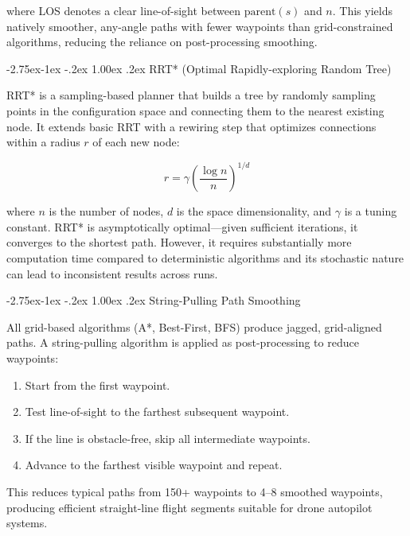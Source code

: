 \documentclass[11pt,a4paper,twocolumn]{article}
\makeatletter
\renewcommand{\subsection}{\@startsection{subsection}{2}{\z@}%
  {-2.75ex\@plus -1ex \@minus -.2ex}%
  {1.00ex \@plus .2ex}%
  {\normalfont\normalsize\bfseries\itshape}}
\makeatother
\begin{document}
\noindent where LOS denotes a clear line-of-sight between $\text{parent}(s)$ and $n$. This yields natively smoother, any-angle paths with fewer waypoints than grid-constrained algorithms, reducing the reliance on post-processing smoothing.

\subsection{RRT* (Optimal Rapidly-exploring Random Tree)}

RRT* \cite{karaman2011rrt} is a sampling-based planner that builds a tree by randomly sampling points in the configuration space and connecting them to the nearest existing node. It extends basic RRT with a rewiring step that optimizes connections within a radius $r$ of each new node:

\begin{equation}
r = \gamma \left(\frac{\log n}{n}\right)^{1/d}
\end{equation}

\noindent where $n$ is the number of nodes, $d$ is the space dimensionality, and $\gamma$ is a tuning constant. RRT* is asymptotically optimal---given sufficient iterations, it converges to the shortest path. However, it requires substantially more computation time compared to deterministic algorithms and its stochastic nature can lead to inconsistent results across runs.

\subsection{String-Pulling Path Smoothing}

All grid-based algorithms (A*, Best-First, BFS) produce jagged, grid-aligned paths. A string-pulling algorithm is applied as post-processing to reduce waypoints:

\begin{enumerate}[leftmargin=*]
    \item Start from the first waypoint.
    \item Test line-of-sight to the farthest subsequent waypoint.
    \item If the line is obstacle-free, skip all intermediate waypoints.
    \item Advance to the farthest visible waypoint and repeat.
\end{enumerate}

This reduces typical paths from 150+ waypoints to 4--8 smoothed waypoints, producing efficient straight-line flight segments suitable for drone autopilot systems.
\end{document}
